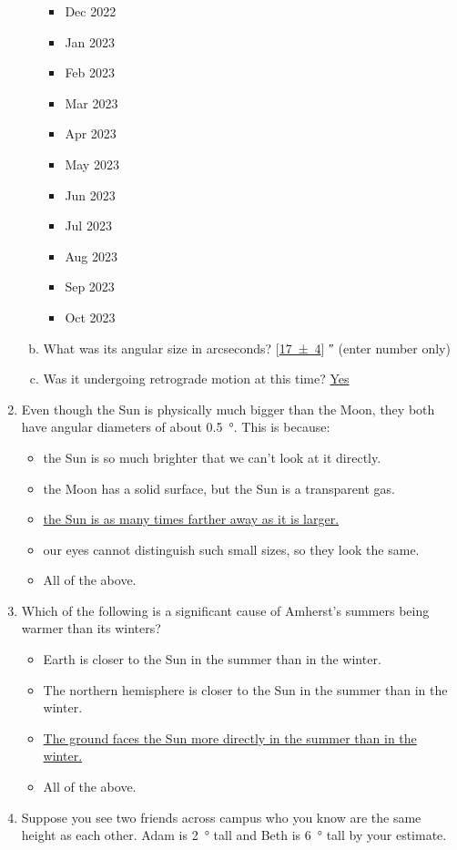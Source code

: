 \documentclass[12pt]{article}
\begin{document}
\begin{enumerate}
\begin{enumerate}[a.]
\begin{itemize}
        \item Dec 2022
        \item Jan 2023
        \item Feb 2023
        \item Mar 2023
        \item Apr 2023
        \item May 2023
        \item Jun 2023
        \item Jul 2023
        \item Aug 2023
        \item Sep 2023
        \item Oct 2023
    \end{itemize}
    \item What was its angular size in arcseconds? [\underline{\num{17(4)}}] \si{\arcsecond} (enter number only)
    \item Was it undergoing retrograde motion at this time? \underline{Yes}
\end{enumerate}
\item
Even though the Sun is physically much bigger than the Moon, they both have angular diameters of about \SI{0.5}{\degree}. This is because:
\begin{itemize}
    \item the Sun is so much brighter that we can’t look at it directly.
    \item the Moon has a solid surface, but the Sun is a transparent gas.
    \item \underline{the Sun is as many times farther away as it is larger.}
    \item our eyes cannot distinguish such small sizes, so they look the same.
    \item All of the above.
\end{itemize}
\item
Which of the following is a significant cause of Amherst’s summers being warmer than its winters?
\begin{itemize}
    \item Earth is closer to the Sun in the summer than in the winter.
    \item The northern hemisphere is closer to the Sun in the summer than in the winter.
    \item \underline{The ground faces the Sun more directly in the summer than in the winter.}
    \item All of the above.
\end{itemize}
\item
Suppose you see two friends across campus who you know are the same height as each other. Adam is \SI{2}{\degree} tall and Beth is \SI{6}{\degree} tall by your estimate.


\end{enumerate}
\end{document}
